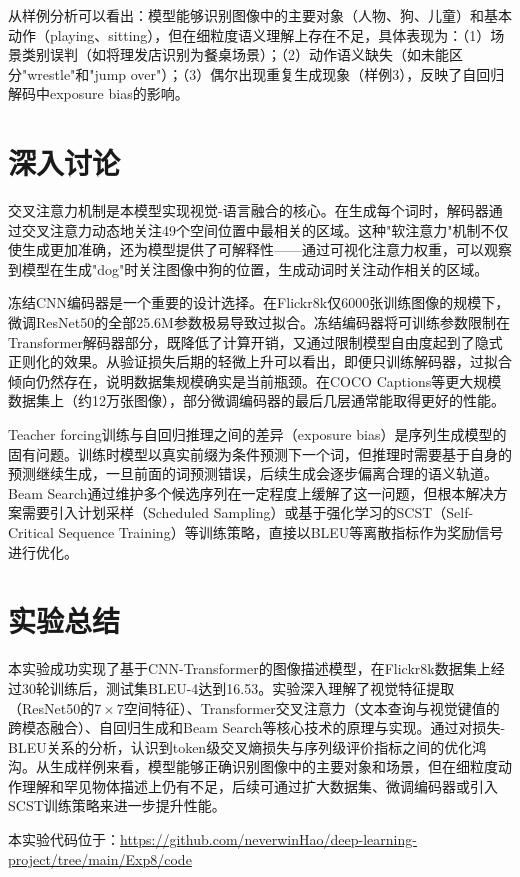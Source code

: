\documentclass[12pt,a4paper]{article}
\begin{document}
从样例分析可以看出：模型能够识别图像中的主要对象（人物、狗、儿童）和基本动作（playing、sitting），但在细粒度语义理解上存在不足，具体表现为：（1）场景类别误判（如将理发店识别为餐桌场景）；（2）动作语义缺失（如未能区分"wrestle"和"jump over"）；（3）偶尔出现重复生成现象（样例3），反映了自回归解码中exposure bias的影响。

\section{深入讨论}

交叉注意力机制是本模型实现视觉-语言融合的核心。在生成每个词时，解码器通过交叉注意力动态地关注49个空间位置中最相关的区域。这种"软注意力"机制不仅使生成更加准确，还为模型提供了可解释性——通过可视化注意力权重，可以观察到模型在生成"dog"时关注图像中狗的位置，生成动词时关注动作相关的区域。

冻结CNN编码器是一个重要的设计选择。在Flickr8k仅6000张训练图像的规模下，微调ResNet50的全部25.6M参数极易导致过拟合。冻结编码器将可训练参数限制在Transformer解码器部分，既降低了计算开销，又通过限制模型自由度起到了隐式正则化的效果。从验证损失后期的轻微上升可以看出，即便只训练解码器，过拟合倾向仍然存在，说明数据集规模确实是当前瓶颈。在COCO Captions等更大规模数据集上（约12万张图像），部分微调编码器的最后几层通常能取得更好的性能。

Teacher forcing训练与自回归推理之间的差异（exposure bias）是序列生成模型的固有问题。训练时模型以真实前缀为条件预测下一个词，但推理时需要基于自身的预测继续生成，一旦前面的词预测错误，后续生成会逐步偏离合理的语义轨道。Beam Search通过维护多个候选序列在一定程度上缓解了这一问题，但根本解决方案需要引入计划采样（Scheduled Sampling）或基于强化学习的SCST（Self-Critical Sequence Training）等训练策略，直接以BLEU等离散指标作为奖励信号进行优化。

\section{实验总结}

本实验成功实现了基于CNN-Transformer的图像描述模型，在Flickr8k数据集上经过30轮训练后，测试集BLEU-4达到16.53。实验深入理解了视觉特征提取（ResNet50的$7\times7$空间特征）、Transformer交叉注意力（文本查询与视觉键值的跨模态融合）、自回归生成和Beam Search等核心技术的原理与实现。通过对损失-BLEU关系的分析，认识到token级交叉熵损失与序列级评价指标之间的优化鸿沟。从生成样例来看，模型能够正确识别图像中的主要对象和场景，但在细粒度动作理解和罕见物体描述上仍有不足，后续可通过扩大数据集、微调编码器或引入SCST训练策略来进一步提升性能。

本实验代码位于：\url{https://github.com/neverwinHao/deep-learning-project/tree/main/Exp8/code}
\end{document}
